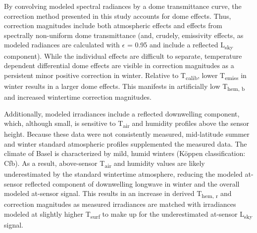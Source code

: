 \begin{bibunit}
By convolving modeled spectral radiances by a dome transmittance curve, the correction method presented in this study accounts for dome effects. Thus, correction magnitudes include both atmospheric effects and effects from spectrally non-uniform dome transmittance (and, crudely, emissivity effects, as modeled radiances are calculated with $\epsilon$ = 0.95 and include a reflected L\textsubscript{sky} component). While the individual effects are difficult to separate, temperature dependent differential dome effects are visible in correction magnitudes as a persistent minor positive correction in winter. Relative to T\textsubscript{calib}, lower T\textsubscript{emiss} in winter results in a larger dome effects. This manifests in artificially low T\textsubscript{hem, b} and increased wintertime correction magnitudes. 

Additionally, modeled irradiances include a reflected downwelling component, which, although small, is sensitive to T\textsubscript{air} and humidity profiles above the sensor height. Because these data were not consistently measured, mid-latitude summer and winter standard atmospheric profiles supplemented the measured data. The climate of Basel is characterized by mild, humid winters (K\"oppen classification: Cfb). As a result, above-sensor T\textsubscript{air} and humidity values are likely underestimated by the standard wintertime atmosphere, reducing the modeled at-sensor reflected component of downwelling longwave in winter and the overall modeled at-sensor signal. This results in an increase in derived T\textsubscript{hem, r} and correction magnitudes as measured irradiances are matched with irradiances modeled at slightly higher T\textsubscript{surf} to make up for the underestimated at-sensor L\textsubscript{sky} signal. 


\end{bibunit}
